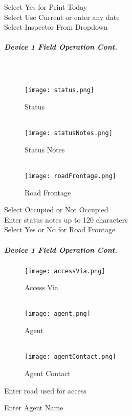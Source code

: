 \documentclass[class=article , crop=false, titlepage, twoside, multi={itemize, figure, verbatim}, float=false]{standalone}
\begin{document}
Select Yes for Print Today\\
\vspace{2.5in}
\noindent Select Use Current or enter any date\\
\vspace{2in}
\noindent Select Inspector From Dropdown\\
\clearpage
\subparagraph*{Device 1 Field Operation Cont.}
\subparagraph*{\\}
\begin{wrapfigure}{r}{0.5\textwidth}
\centering
\texttt{[image: status.png]}
\caption {Status}
\vspace{.2in}
\HRule \\[.4cm] %
\vspace{.2in}
\texttt{[image: statusNotes.png]}
\caption{Status Notes}
\vspace{.2in}
\HRule \\[.4cm] %
\vspace{.2in}
\texttt{[image: roadFrontage.png]}
\caption{Road Frontage}
\end{wrapfigure}
Select Occupied or Not Occupied\\
\vspace{2in}
\noindent Enter status notes up to 120 characters\\
\vspace{2in}
\noindent Select Yes or No for Road Frontage\\
\clearpage
\subparagraph*{Device 1 Field Operation Cont.}
\begin{wrapfigure}{r}{0.5\textwidth}
\centering
\texttt{[image: accessVia.png]}
\caption {Access Via}
\vspace{.2in}
\HRule \\[.4cm] %
\vspace{.2in}
\texttt{[image: agent.png]}
\caption{Agent}
\vspace{.2in}
\HRule \\[.4cm] %
\vspace{.2in}
\texttt{[image: agentContact.png]}
\caption{Agent Contact}
\end{wrapfigure}
Enter road used for access\\
\vspace{2in}

\noindent Enter Agent Name\\
\vspace{2in}
\end{document}
